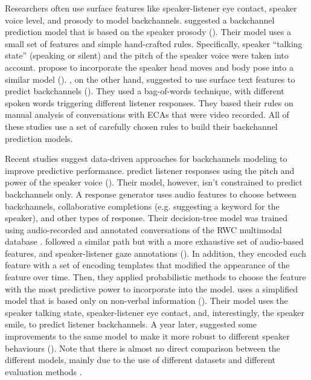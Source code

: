 \documentclass[]{simple-thesis}
\begin{document}
Researchers often use surface features like speaker-listener eye contact, speaker voice level, and prosody to model backchannels.
\citeauthor{Ward2000} suggested a backchannel prediction model that is based on the speaker prosody (\citeyear{Ward2000}).
Their model uses a small set of features and simple hand-crafted rules.
Specifically, speaker ``talking state'' (speaking or silent) and the pitch of the speaker voice were taken into account.
\citeauthor{Gratch2006} propose to incorporate the speaker head moves and body pose into a similar model (\citeyear{Gratch2006}).
\citeauthor{Lee2006}, on the other hand, suggested to use surface text features to predict backchannels (\citeyear{Lee2006}).
They used a bag-of-words technique, with different spoken words triggering different listener responses.
They based their rules on manual analysis of conversations with ECAs that were video recorded.
All of these studies use a set of carefully chosen rules to build their backchannel prediction models.

Recent studies suggest data-driven approaches for backchannels modeling to improve predictive performance.
\citeauthor{Nishimura2007} predict listener responses using the pitch and power of the speaker voice (\citeyear{Nishimura2007}).
Their model, however, isn't constrained to predict backchannels only.
A response generator uses audio features to choose between backchannels, collaborative completions (e.g. suggesting a keyword for the speaker), and other types of response.
Their decision-tree model was trained using audio-recorded and annotated conversations of the RWC multimodal database \citep{Hayamizu1996}.
\citeauthor{Morency2008} followed a similar path but with a more exhaustive set of audio-based features, and speaker-listener gaze annotations (\citeyear{Morency2008}).
In addition, they encoded each feature with a set of encoding templates that modified the appearance of the feature over time.
Then, they applied probabilistic methods to choose the feature with the most predictive power to incorporate into the model.
\citeauthor{Huang2011} uses a simplified model that is based only on non-verbal information (\citeyear{Huang2011}).
Their model uses the speaker talking state, speaker-listener eye contact, and, interestingly, the speaker smile, to predict listener backchannels.
A year later, \citeauthor{Kok2012} suggested some improvements to the same model to make it more robust to different speaker behaviours (\citeyear{Kok2012}).
Note that there is almost no direct comparison between the different models, mainly due to the use of different datasets and different evaluation methods \citep{Morency2008}.
\end{document}
